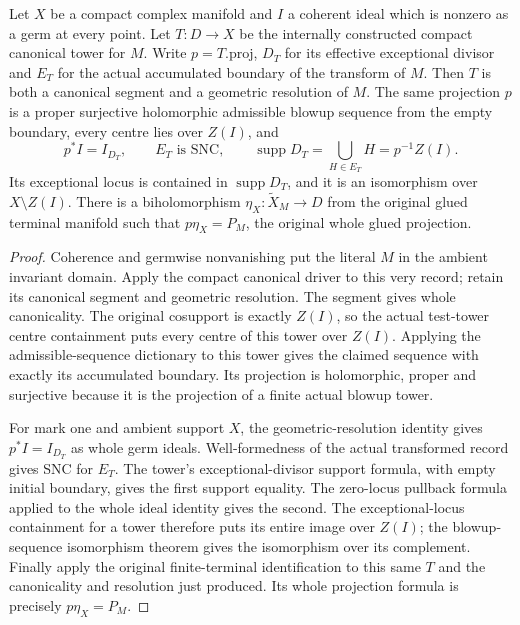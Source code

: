 \begin{theorem}
\label{hir:original-canonical-elementary-principalization}
\leanok
{}
Let $X$ be a compact complex manifold and $I$ a coherent ideal which is
nonzero as a germ at every point.  Let $T:D\to X$ be the internally
constructed compact canonical tower for $M$.  Write $p=T.\mathrm{proj}$,
$D_T$ for its effective exceptional divisor and $E_T$ for the actual
accumulated boundary of the transform of $M$.  Then $T$ is both a canonical
segment and a geometric resolution of $M$.  The same projection $p$ is a
proper surjective holomorphic admissible blowup sequence from the empty
boundary, every centre lies over $Z(I)$, and
\[
 p^* I=I_{D_T},\qquad E_T\text{ is SNC},\qquad
 \operatorname{supp}D_T=\bigcup_{H\in E_T}H=p^{-1}Z(I).
\]
Its exceptional locus is contained in $\operatorname{supp}D_T$, and it is
an isomorphism over $X\setminus Z(I)$.  There is a biholomorphism
$\eta_X:\widetilde X_M\to D$ from the original glued terminal manifold
such that $p\eta_X=P_M$, the original whole glued projection.
\end{theorem}
\begin{proof}
Coherence and germwise nonvanishing put the literal $M$ in the ambient
invariant domain.  Apply the compact canonical driver to this very record;
retain its canonical segment and geometric resolution.  The segment gives
whole canonicality.  The original cosupport is exactly $Z(I)$, so the
actual test-tower centre containment puts every centre of this tower over
$Z(I)$.  Applying the admissible-sequence dictionary to this tower gives
the claimed sequence with exactly its accumulated boundary.  Its
projection is holomorphic, proper and surjective because it is the
projection of a finite actual blowup tower.

For mark one and ambient support $X$, the geometric-resolution identity
gives $p^*I=I_{D_T}$ as whole germ ideals.  Well-formedness of the actual
transformed record gives SNC for $E_T$.  The tower's exceptional-divisor
support formula, with empty initial boundary, gives the first support
equality.  The zero-locus pullback formula applied to the whole ideal
identity gives the second.  The exceptional-locus containment for a tower
therefore puts its entire image over $Z(I)$; the blowup-sequence
isomorphism theorem gives the isomorphism over its complement.  Finally
apply the original finite-terminal identification to this same $T$ and
the canonicality and resolution just produced.  Its whole projection
formula is precisely $p\eta_X=P_M$.
\end{proof}

